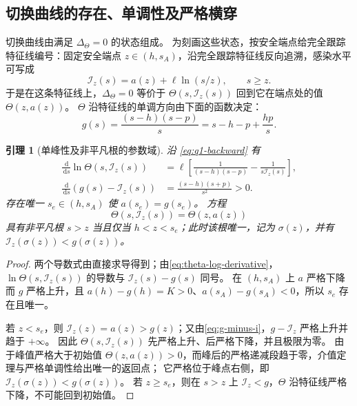 \documentclass[11pt,a4paper,UTF8]{ctexart}
\newtheorem{lemma}[theorem]{引理}
\theoremstyle{definition}
\newcommand{\dd}{\,\mathrm d}
\begin{document}
\subsection{切换曲线的存在、单调性及严格横穿}
\label{sec:switching-curve}
切换曲线由满足 $\Delta_\Theta=0$ 的状态组成。
为刻画这些状态，按安全端点给完全跟踪特征线编号：固定安全端点 $z\in(h,s_A)$，沿完全跟踪特征线反向追溯，感染水平可写成
\begin{equation}
\mathcal I_z(s)=a(z)+\ell\ln(s/z),\qquad s\ge z.
\label{eq:q1-backward}
\end{equation}
于是在这条特征线上，$\Delta_\Theta=0$ 等价于 $\Theta(s,\mathcal I_z(s))$ 回到它在端点处的值 $\Theta(z,a(z))$。
$\Theta$ 沿特征线的单调方向由下面的函数决定：
\begin{equation}
g(s)=\frac{(s-h)(s-p)}s=s-h-p+\frac{hp}{s}.
\label{eq:g}
\end{equation}

\begin{lemma}[单峰性及非平凡根的参数域]
\label{lem:unimodal}
沿 \eqref{eq:q1-backward} 有
\begin{align}
\frac{\dd}{\dd s}\ln\Theta(s,\mathcal I_z(s))
&=\ell\left[\frac1{(s-h)(s-p)}-\frac1{s\mathcal I_z(s)}\right],
\label{eq:theta-log-derivative}\\
\frac{\dd}{\dd s}(g(s)-\mathcal I_z(s))
&=\frac{(s-h)(s+p)}{s^2}>0.
\label{eq:g-minus-i}
\end{align}
存在唯一 $s_e\in(h,s_A)$ 使 $a(s_e)=g(s_e)$。
方程
\begin{equation}
\Theta(s,\mathcal I_z(s))=\Theta(z,a(z))
\label{eq:switch-condition}
\end{equation}
具有非平凡根 $s>z$ 当且仅当 $h<z<s_e$；此时该根唯一，记为 $\sigma(z)$，并有
$\mathcal I_z(\sigma(z))<g(\sigma(z))$。
\end{lemma}
\begin{proof}
两个导数式由直接求导得到；由\eqref{eq:theta-log-derivative}，$\ln\Theta(s,\mathcal I_z(s))$ 的导数与 $\mathcal I_z(s)-g(s)$ 同号。
在 $(h,s_A)$ 上 $a$ 严格下降而 $g$ 严格上升，且 $a(h)-g(h)=K>0$、$a(s_A)-g(s_A)<0$，所以 $s_e$ 存在且唯一。

若 $z<s_e$，则 $\mathcal I_z(z)=a(z)>g(z)$；又由\eqref{eq:g-minus-i}，$g-\mathcal I_z$ 严格上升并趋于 $+\infty$。
因此 $\Theta(s,\mathcal I_z(s))$ 先严格上升、后严格下降，并且极限为零。
由于峰值严格大于初始值 $\Theta(z,a(z))>0$，而峰后的严格递减段趋于零，介值定理与严格单调性给出唯一的返回点；
它严格位于峰点右侧，即 $\mathcal I_z(\sigma(z))<g(\sigma(z))$。
若 $z\ge s_e$，则在 $s>z$ 上 $\mathcal I_z<g$，$\Theta$ 沿特征线严格下降，不可能回到初始值。
\end{proof}
\end{document}
